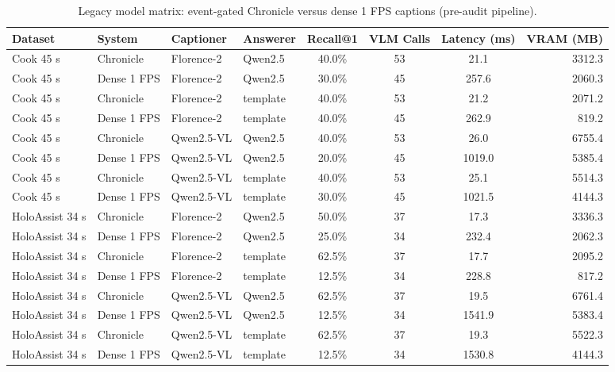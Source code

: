 \begin{table}[t]
  \centering
  \caption{Legacy model matrix: event-gated Chronicle versus dense 1 FPS
  captions (pre-audit pipeline).}
  \label{tab:model-matrix}
  \small
  \begin{tabular}{llllcccr}
    \toprule
    Dataset & System & Captioner & Answerer & Recall@1 & VLM Calls & Latency (ms) & VRAM (MB) \\
    \midrule
    Cook 45 s & Chronicle & Florence-2 & Qwen2.5 & 40.0\% & 53 & 21.1 & 3312.3 \\
    Cook 45 s & Dense 1 FPS & Florence-2 & Qwen2.5 & 30.0\% & 45 & 257.6 & 2060.3 \\
    Cook 45 s & Chronicle & Florence-2 & template & 40.0\% & 53 & 21.2 & 2071.2 \\
    Cook 45 s & Dense 1 FPS & Florence-2 & template & 40.0\% & 45 & 262.9 & 819.2 \\
    Cook 45 s & Chronicle & Qwen2.5-VL & Qwen2.5 & 40.0\% & 53 & 26.0 & 6755.4 \\
    Cook 45 s & Dense 1 FPS & Qwen2.5-VL & Qwen2.5 & 20.0\% & 45 & 1019.0 & 5385.4 \\
    Cook 45 s & Chronicle & Qwen2.5-VL & template & 40.0\% & 53 & 25.1 & 5514.3 \\
    Cook 45 s & Dense 1 FPS & Qwen2.5-VL & template & 30.0\% & 45 & 1021.5 & 4144.3 \\
    \midrule
    HoloAssist 34 s & Chronicle & Florence-2 & Qwen2.5 & 50.0\% & 37 & 17.3 & 3336.3 \\
    HoloAssist 34 s & Dense 1 FPS & Florence-2 & Qwen2.5 & 25.0\% & 34 & 232.4 & 2062.3 \\
    HoloAssist 34 s & Chronicle & Florence-2 & template & 62.5\% & 37 & 17.7 & 2095.2 \\
    HoloAssist 34 s & Dense 1 FPS & Florence-2 & template & 12.5\% & 34 & 228.8 & 817.2 \\
    HoloAssist 34 s & Chronicle & Qwen2.5-VL & Qwen2.5 & 62.5\% & 37 & 19.5 & 6761.4 \\
    HoloAssist 34 s & Dense 1 FPS & Qwen2.5-VL & Qwen2.5 & 12.5\% & 34 & 1541.9 & 5383.4 \\
    HoloAssist 34 s & Chronicle & Qwen2.5-VL & template & 62.5\% & 37 & 19.3 & 5522.3 \\
    HoloAssist 34 s & Dense 1 FPS & Qwen2.5-VL & template & 12.5\% & 34 & 1530.8 & 4144.3 \\
    \bottomrule
  \end{tabular}
\end{table}
